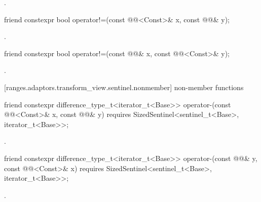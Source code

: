 \begin{itemdescr}
\pnum
\returns {}.
\end{itemdescr}

%
\begin{itemdecl}
friend constexpr bool operator!=(const @@<Const>& x, const @@& y);
\end{itemdecl}

\begin{itemdescr}
\pnum
\returns {}.
\end{itemdescr}

%
\begin{itemdecl}
friend constexpr bool operator!=(const @@& x, const @@<Const>& y);
\end{itemdecl}

\begin{itemdescr}
\pnum
\returns {}.
\end{itemdescr}

[ranges.adaptors.transform_view.sentinel.nonmember]{ non-member functions}

%
\begin{itemdecl}
friend constexpr difference_type_t<iterator_t<Base>>
operator-(const @@<Const>& x, const @@& y)
  requires SizedSentinel<sentinel_t<Base>, iterator_t<Base>>;
\end{itemdecl}

\begin{itemdescr}
\pnum
\returns {}.
\end{itemdescr}

%
\begin{itemdecl}
friend constexpr difference_type_t<iterator_t<Base>>
operator-(const @@& y, const @@<Const>& x)
  requires SizedSentinel<sentinel_t<Base>, iterator_t<Base>>;
\end{itemdecl}

\begin{itemdescr}
\pnum
\returns {}.
\end{itemdescr}

